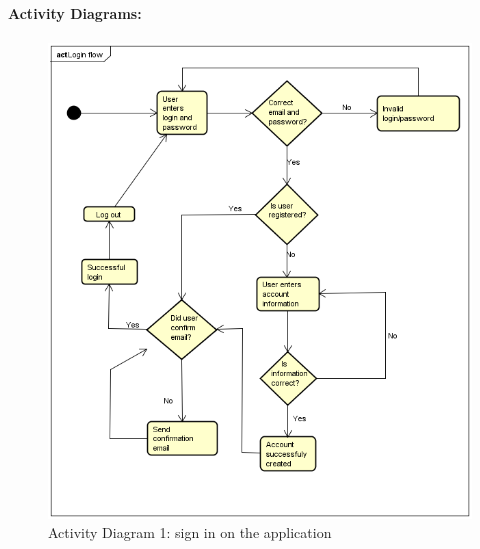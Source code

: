 \documentclass[paper=a4, fontsize=12pt,DIV=14]{scrartcl}    %
\begin{document}
		                \paragraph{Activity Diagrams:}
        				\paragraph{}

		                \begin{figure}[!htbp]
		                    \center
		                    \includegraphics[scale=1]{img/act_login.png}
		                    \caption{Activity Diagram 1: sign in on the application}
		                \end{figure}
		                \newpage
\end{document}
